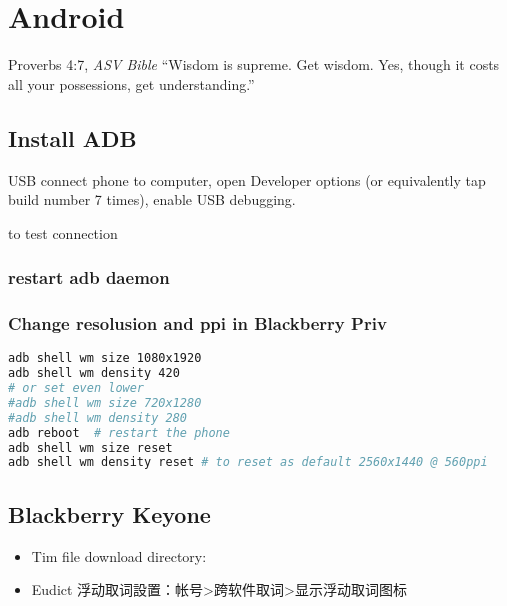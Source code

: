 \chapter{Android}

\begin{chapquote}{Proverbs 4:7, \textit{ASV Bible}}
``Wisdom is supreme. Get wisdom. Yes, though it costs all your possessions, get understanding.''
\end{chapquote}


\section{Install ADB}


USB connect phone to computer, open Developer options (or equivalently tap build number 7 times), enable USB debugging.

 to test connection

\subsection{restart adb daemon}

\subsection{Change resolusion and ppi in Blackberry Priv}

\begin{lstlisting}[language=bash, caption={}]
adb shell wm size 1080x1920
adb shell wm density 420
# or set even lower
#adb shell wm size 720x1280
#adb shell wm density 280
adb reboot  # restart the phone
adb shell wm size reset
adb shell wm density reset # to reset as default 2560x1440 @ 560ppi
\end{lstlisting}


\section{Blackberry Keyone}

\begin{itemize}
\item Tim file download directory: 
\item Eudict 浮动取词設置：帐号>跨软件取词>显示浮动取词图标
\end{itemize}



